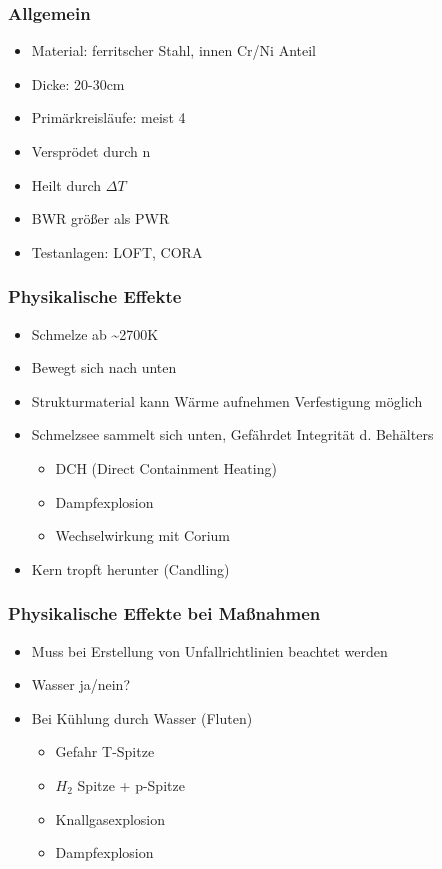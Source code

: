 \documentclass[12pt]{article}
\begin{document}
\subsubsection{Allgemein}
\begin{itemize}[noitemsep]
	\item Material: ferritscher Stahl, innen Cr/Ni Anteil
	\item Dicke: 20-30cm
	\item Primärkreisläufe: meist 4
	\item Versprödet durch n
	\item Heilt durch \(\Delta T\)
	\item BWR größer als PWR
	\item Testanlagen: LOFT, CORA
\end{itemize}

\subsubsection{Physikalische Effekte}
\begin{itemize}[noitemsep]
	\item Schmelze ab \textasciitilde 2700K
	\item Bewegt sich nach unten
	\item Strukturmaterial kann Wärme aufnehmen \textrightarrow Verfestigung möglich
	\item Schmelzsee sammelt sich unten, Gefährdet Integrität d. Behälters
		\begin{itemize}[noitemsep]
			\item DCH (Direct Containment Heating)
			\item Dampfexplosion
			\item Wechselwirkung mit Corium
		\end{itemize}
	\item Kern tropft herunter (Candling)
\end{itemize}

\subsubsection{Physikalische Effekte bei Maßnahmen}
\begin{itemize}[noitemsep]
	\item Muss bei Erstellung von Unfallrichtlinien beachtet werden
	\item Wasser ja/nein?
	\item Bei Kühlung durch Wasser (Fluten)
		\begin{itemize}[noitemsep]
			\item Gefahr T-Spitze
			\item \(H_2\) Spitze + p-Spitze
			\item Knallgasexplosion
			\item Dampfexplosion
		\end{itemize}
\end{itemize}
\end{document}

